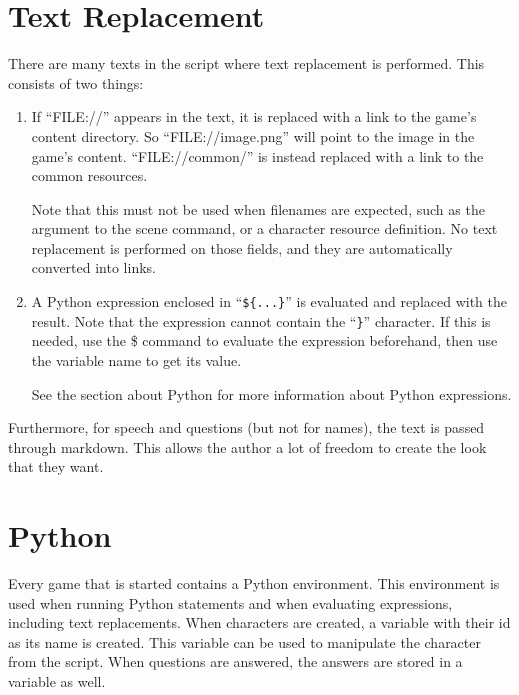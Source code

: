 \documentclass{article}
\begin{document}
\section{Text Replacement}
There are many texts in the script where text replacement is performed. This
consists of two things:
\begin{enumerate}
	\item If ``FILE://'' appears in the text, it is replaced with a link to
		the game's content directory. So ``FILE://image.png'' will
		point to the image in the game's content. ``FILE://common/'' is
		instead replaced with a link to the common resources.

		Note that this must not be used when filenames are expected,
		such as the argument to the scene command, or a character
		resource definition. No text replacement is performed on those
		fields, and they are automatically converted into links.

	\item A Python expression enclosed in ``\verb-${...}-'' is evaluated
		and replaced with the result. Note that the expression cannot
		contain the ``\verb-}-'' character. If this is needed, use the
		\$ command to evaluate the expression beforehand, then use the
		variable name to get its value.

		See the section about Python for more information about Python
		expressions.
\end{enumerate}

Furthermore, for speech and questions (but not for names), the text is passed
through markdown. This allows the author a lot of freedom to create the look
that they want.

\section{Python}
Every game that is started contains a Python environment. This environment is
used when running Python statements and when evaluating expressions, including
text replacements. When characters are created, a variable with their id as its
name is created. This variable can be used to manipulate the character from the
script. When questions are answered, the answers are stored in a variable as
well.
\end{document}

